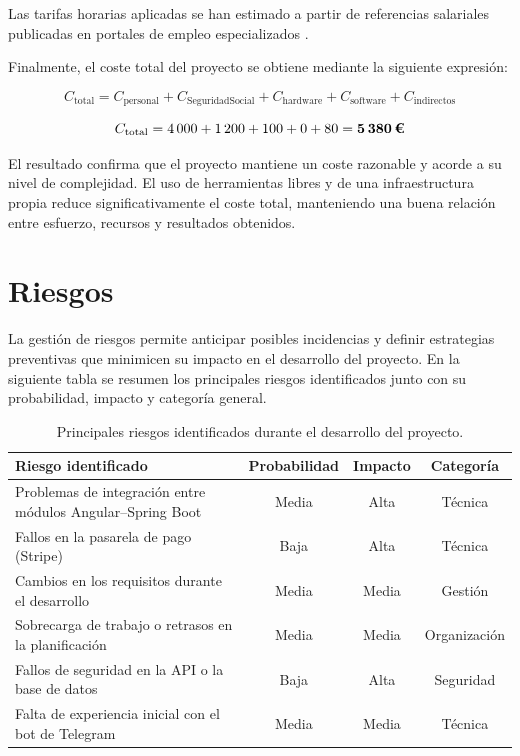 Las tarifas horarias aplicadas se han estimado a partir de referencias salariales publicadas en portales de empleo especializados \cite{Indeed2025}.

Finalmente, el coste total del proyecto se obtiene mediante la siguiente expresión:

\[
C_{\text{total}} = C_{\text{personal}} + C_{\text{SeguridadSocial}} + C_{\text{hardware}} + C_{\text{software}} + C_{\text{indirectos}}
\]

\[
C_{\text{total}} = 4\,000 + 1\,200 + 100 + 0 + 80 = \textbf{5\,380\,€}
\]

El resultado confirma que el proyecto mantiene un coste razonable y acorde a su nivel de complejidad. 
El uso de herramientas libres y de una infraestructura propia reduce significativamente el coste total, 
manteniendo una buena relación entre esfuerzo, recursos y resultados obtenidos.


\clearpage
\section{Riesgos}

La gestión de riesgos permite anticipar posibles incidencias y definir estrategias preventivas que minimicen su impacto en el desarrollo del proyecto. 
En la siguiente tabla se resumen los principales riesgos identificados junto con su probabilidad, impacto y categoría general.

\begin{table}[H]
\centering
\begin{tabular}{|L{6.5cm}|c|c|c|}
\hline
\textbf{Riesgo identificado} & \textbf{Probabilidad} & \textbf{Impacto} & \textbf{Categoría} \\
\hline
Problemas de integración entre módulos Angular–Spring Boot & Media & Alta & Técnica \\
\hline
Fallos en la pasarela de pago (Stripe) & Baja & Alta & Técnica \\
\hline
Cambios en los requisitos durante el desarrollo & Media & Media & Gestión \\
\hline
Sobrecarga de trabajo o retrasos en la planificación & Media & Media & Organización \\
\hline
Fallos de seguridad en la API o la base de datos & Baja & Alta & Seguridad \\
\hline
Falta de experiencia inicial con el bot de Telegram & Media & Media & Técnica \\
\hline
\end{tabular}
\caption{Principales riesgos identificados durante el desarrollo del proyecto.}
\end{table}

